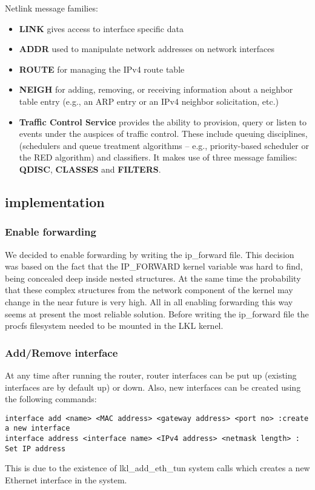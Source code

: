 {{Netlink message families:
\begin{itemize}
\item{\bf LINK} gives access to interface specific data
\item{\bf ADDR} used to manipulate network addresses on network interfaces
\item{\bf ROUTE} for managing the IPv4 route table
\item{\bf NEIGH} for adding, removing, or receiving information about a neighbor table entry (e.g., an ARP entry or an IPv4 neighbor solicitation, etc.)
\item \textbf{Traffic Control Service} provides the ability to provision, query or listen to
   events under the auspices of traffic control.  These include queuing
   disciplines, (schedulers and queue treatment algorithms -- e.g.,
   priority-based scheduler or the RED algorithm) and classifiers. It makes use of three message families: \textbf{QDISC}, \textbf{CLASSES} and \textbf{\bf FILTERS}.
\end{itemize} 

\subsection{\project implementation}
\label{sub-sec:router-lklnet}
\subsubsection{Enable forwarding}
We decided to enable forwarding by writing the ip_forward file. This decision was based on the fact that the 
IP_FORWARD kernel variable was hard to find, being concealed deep inside nested structures. At the same time 
the probability that these complex structures from the network component of the kernel may change in the near 
future is very high. All in all enabling forwarding this way seems at present the most reliable solution.
Before writing the ip_forward file the procfs filesystem needed to be mounted in the LKL kernel. 

\subsubsection{Add/Remove interface}
At any time after running the router, router interfaces can be put up (existing interfaces are by default up) 
or down. Also, new interfaces can be created using the following commands:
\lstset{language=TeX,caption=Adding a new interface,label=lst:saddrule}
\begin{lstlisting}
interface add <name> <MAC address> <gateway address> <port no> :create a new interface
interface address <interface name> <IPv4 address> <netmask length> : Set IP address 
\end{lstlisting}  
This is due to the existence of lkl_add_eth_tun system calls which creates a new Ethernet interface in the system.
 
}}
